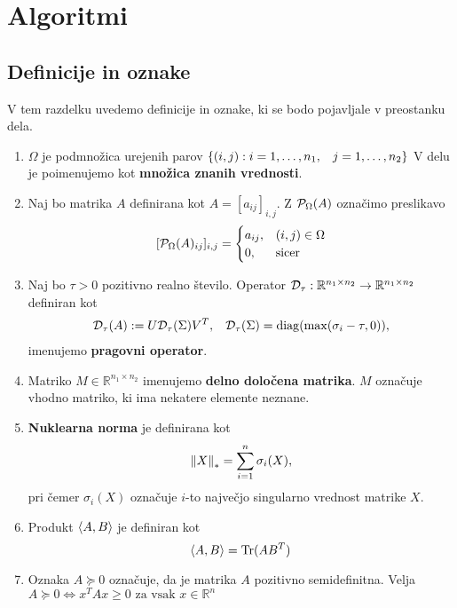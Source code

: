 \chapter{Algoritmi} \label{1407-1011}


\section{Definicije in oznake}
V tem razdelku uvedemo definicije in oznake, ki se bodo pojavljale v preostanku dela.
\begin{enumerate}
  \item $\Omega$ je podmnožica urejenih parov $\{ (i, j) : i = 1, \hdots , n_1, \hspace{0.3cm} j = 1, \hdots, n_2 \}$ V delu je poimenujemo kot \textbf{množica znanih vrednosti}.
  \item Naj bo matrika $A$ definirana kot $A = [a_{ij}]_{i,j}$. Z $\mathcal{P}_\Omega(A)$ označimo preslikavo 
        \[ [\mathcal{P}_\Omega(A)_{ij}]_{i,j} = \begin{cases}
            a_{ij}, & (i, j) \in \Omega \\
            0,      & \text{sicer}
          \end{cases}
        \]
  \item Naj bo $\tau > 0$ pozitivno realno število. Operator $\mathcal{D}_\tau: \mathbb{R}^{n_1 \times n_2} \rightarrow \mathbb{R}^{n_1 \times n_2}$ definiran kot
        \begin{align}
          \label{1007-1959}
          \mathcal{D}_\tau(A) := U \mathcal{D}_\tau(\Sigma) V^T, \hspace{0.3cm} \mathcal{D}_\tau(\Sigma) = \operatorname{diag}(\max(\sigma_i - \tau, 0)),
        \end{align}
        imenujemo \textbf{pragovni operator}. \cite{CCS}
  \item Matriko $M \in \mathbb{R}^{n_1 \times n_2}$ imenujemo \textbf{delno določena matrika}. $M$ označuje vhodno matriko, ki ima nekatere elemente neznane.
  \item \textbf{Nuklearna norma} je definirana kot \[
          \left\lVert X\right\rVert_* = \sum_{i = 1}^{n} \sigma_i(X),
        \] pri čemer $\sigma_i(X)$ označuje $i$-to največjo singularno vrednost matrike $X$.
  \item Produkt $\langle A, B \rangle$ je definiran kot \[
          \langle A, B \rangle = \text{Tr}(AB^T)
        \]
  \item Oznaka $A \succeq 0$ označuje, da je matrika $A$ pozitivno semidefinitna. Velja $A \succeq 0 \iff x^TAx \ge 0 \text{ za vsak } x \in \mathbb{R}^n$

\end{enumerate}
